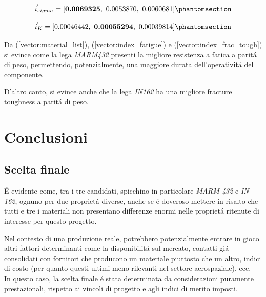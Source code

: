 \documentclass{article}
\begin{document}
        \begin{equation}
            \vec{i}_{sigma} = [\textbf{0.0069325}, \  0.0053870, \  0.0060681
            ]
            \phantomsection \label{vector:index_fatigue}
        \end{equation}

        \begin{equation}
            \vec{i}_{K} = [0.00046442, \  \textbf{0.00055294}, \  0.00039814]
            \phantomsection \label{vector:index_frac_tough}
        \end{equation}

        Da (\ref{vector:material_list}), (\ref{vector:index_fatigue}) e (\ref{vector:index_frac_tough}) si evince come 
        la lega \textit{MARM432} presenti la migliore resistenza a fatica a paritá di peso, permettendo, potenzialmente, 
        una maggiore durata dell'operativitá del componente.

        D'altro canto, si evince anche che la lega \textit{IN162} ha una migliore fracture toughness a paritá di peso. 

        
        \clearpage


    \section{Conclusioni\label{conclusioni}}

    \subsection{Scelta finale \label{scelta_finale}}

    É evidente come, tra i tre candidati, spicchino  in particolare \textit{MARM-432} e \textit{IN-162}, 
    ognuno per due proprietá diverse, anche se é doveroso mettere in risalto che tutti e tre i materiali
    non presentano differenze enormi nelle proprietá ritenute di interesse per questo progetto.
    
    Nel contesto di una produzione reale, potrebbero potenzialmente entrare in gioco altri fattori determinanti come
    la disponibilitá sul mercato, contatti giá consolidati con fornitori che producono un materiale piuttosto 
    che un altro, indici di costo (per quanto questi ultimi meno rilevanti nel settore aerospaziale), ecc. \\ 

    In questo caso, la scelta finale é stata determinata da considerazioni puramente prestazionali, rispetto 
    ai vincoli di progetto e agli indici di merito imposti. 
\end{document}
